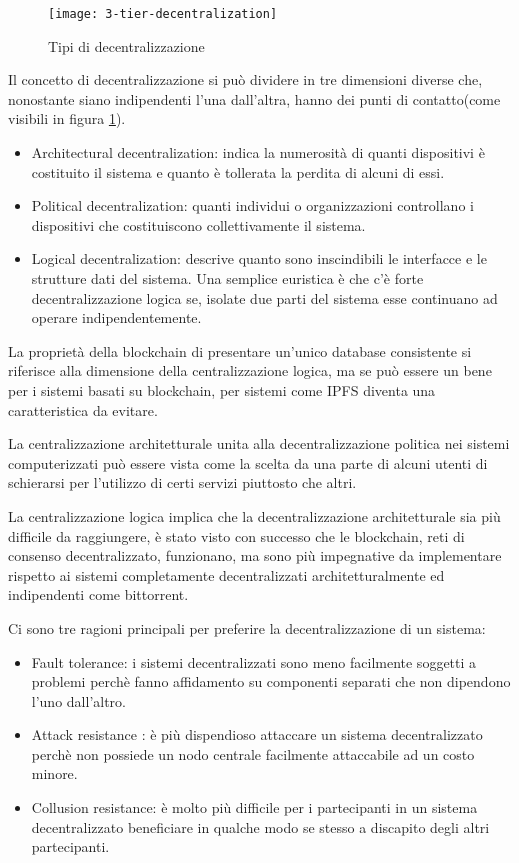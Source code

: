 	\begin{figure}
		\caption{Tipi di decentralizzazione}
		\centering
		\texttt{[image: 3-tier-decentralization]}
		\label{fig:3-tier-decentralization}
	\end{figure}
	
	Il concetto di decentralizzazione si può dividere in tre dimensioni diverse che, nonostante siano indipendenti l'una dall'altra, hanno dei punti di contatto(come visibili in figura \ref{fig:3-tier-decentralization}). 
	\begin{itemize}
		\item Architectural decentralization: indica la numerosità di quanti dispositivi è costituito il sistema e quanto è tollerata la perdita di alcuni di essi.
		\item Political decentralization: quanti individui o organizzazioni controllano i dispositivi che costituiscono collettivamente il sistema.
		\item Logical decentralization: descrive quanto sono inscindibili le interfacce e le strutture dati del sistema. Una semplice euristica è che c'è forte decentralizzazione logica se, isolate due parti del sistema esse continuano ad operare indipendentemente.
	\end{itemize}
	
	La proprietà della blockchain di presentare un'unico database consistente si riferisce alla dimensione della centralizzazione logica, ma se può essere un bene per i sistemi basati su blockchain, per sistemi come IPFS diventa una caratteristica da evitare.
	
	La centralizzazione architetturale unita alla decentralizzazione politica nei sistemi computerizzati può essere vista come la scelta da una parte di alcuni utenti di schierarsi per l'utilizzo di certi servizi piuttosto che altri. 
	
	La centralizzazione logica implica che la decentralizzazione architetturale sia più difficile da raggiungere, è stato visto con successo che le blockchain, reti di consenso decentralizzato, funzionano, ma sono più impegnative da implementare rispetto ai sistemi completamente decentralizzati architetturalmente ed indipendenti come bittorrent.
	
	Ci sono tre ragioni principali per preferire la decentralizzazione di un sistema:
	
	\begin{itemize}
		\item Fault tolerance: i sistemi decentralizzati sono meno facilmente soggetti a problemi perchè fanno affidamento su componenti separati che non dipendono l'uno dall'altro.
		\item Attack resistance : è più dispendioso attaccare un sistema decentralizzato perchè non possiede un nodo centrale facilmente attaccabile ad un costo minore.
		\item Collusion resistance: è molto più difficile per i partecipanti in un sistema decentralizzato beneficiare in qualche modo se stesso a discapito degli altri partecipanti.
	\end{itemize}
	

